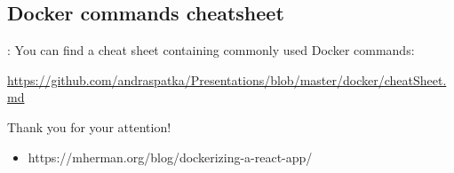 \documentclass{beamer}
\begin{document}
\subsection{Docker commands cheatsheet}
\begin{frame}{\secname : \subsecname}
    You can find a cheat sheet containing commonly used Docker commands:

    \url{https://github.com/andraspatka/Presentations/blob/master/docker/cheatSheet.md}
\end{frame}


\begin{frame}
\centering
{\Huge Thank you for your attention!}
\end{frame}

\begin{footnotesize}
    \begin{itemize}
        \item https://mherman.org/blog/dockerizing-a-react-app/
    \end{itemize}
\end{footnotesize}
\end{document}
